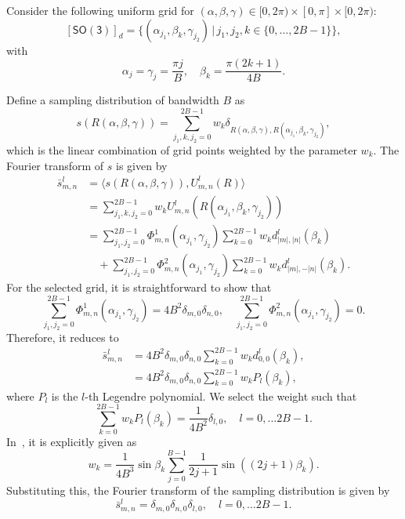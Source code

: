 \documentclass[onecolumn,11pt]{IEEEtran}
\newcommand{\pair}[1]{\ensuremath{\langle #1 \rangle}}
\newcommand{\SO}{\ensuremath{\mathsf{SO(3)}}}
\begin{document}
Consider the following uniform grid for $(\alpha,\beta,\gamma)\in[0,2\pi)\times[0,\pi]\times[0,2\pi)$:
\[
[\SO]_d=\{(\alpha_{j_1},\beta_k,\gamma_{j_2})\,|\, j_1,j_2,k\in\{0,\ldots, 2B-1\}\},
\]
with
\begin{equation}\label{eqn:grid_real}
\alpha_j=\gamma_j= \frac{\pi j}{B},\quad \beta_k = \frac{\pi (2k+1)}{4B}.
\end{equation}

Define a sampling distribution of bandwidth $B$ as
\begin{equation}
s(R(\alpha,\beta,\gamma))=\sum_{j_1,k,j_2=0}^{2B-1} w_k \delta_{R(\alpha,\beta,\gamma),R(\alpha_{j_1},\beta_k,\gamma_{j_2})},
\end{equation}
which is the linear combination of grid points weighted by the parameter $w_k$. 
The Fourier transform of $s$ is given by
\begin{align*}
\bar s^l_{m,n} & = \pair{s(R(\alpha,\beta,\gamma)), U^l_{m,n}(R)}\\
               & = \sum_{j_1,k,j_2=0}^{2B-1} w_k U^l_{m,n}(R(\alpha_{j_1},\beta_k,\gamma_{j_2}))\\
               & = \sum_{j_1,j_2=0}^{2B-1} \Phi^1_{m,n}(\alpha_{j_1},\gamma_{j_2}) \sum_{k=0}^{2B-1} w_k d^l_{|m|,|n|}(\beta_k)\\
               & \quad + \sum_{j_1,j_2=0}^{2B-1} \Phi^2_{m,n}(\alpha_{j_1},\gamma_{j_2}) \sum_{k=0}^{2B-1} w_k d^l_{|m|,-|n|}(\beta_k).
\end{align*}
For the selected grid, it is straightforward to show that
\[
    \sum_{j_1,j_2=0}^{2B-1} \Phi^1_{m,n}(\alpha_{j_1},\gamma_{j_2})=4B^2 \delta_{m,0}\delta_{n,0},\quad
    \sum_{j_1,j_2=0}^{2B-1} \Phi^2_{m,n}(\alpha_{j_1},\gamma_{j_2})=0.
\]
Therefore, it reduces to
\begin{align*}
\bar s^l_{m,n}  
& = 4B^2 \delta_{m,0}\delta_{n,0}\sum_{k=0}^{2B-1} w_k d^l_{0,0}(\beta_k),\\
& = 4B^2 \delta_{m,0}\delta_{n,0}\sum_{k=0}^{2B-1} w_k P_l(\beta_k),
\end{align*}
where $P_l$ is the $l$-th Legendre polynomial. 
We select the weight such that
\begin{equation}
\sum_{k=0}^{2B-1} w_k P_l(\beta_k) = \frac{1}{4B^2} \delta_{l,0},\quad l=0,\ldots 2B-1.
\end{equation}
In~\cite{DriHeaAAM94}, it is explicitly given as
\begin{equation}
w_k = \frac{1}{4B^3}\sin\beta_k \sum_{j=0}^{B-1} \frac{1}{2j+1}\sin((2j+1)\beta_k).
\end{equation}
Substituting this, the Fourier transform of the sampling distribution is given by
\begin{equation}
\bar s ^l_{m,n}=\delta_{m,0}\delta_{n,0}\delta_{l,0},\quad l=0,\ldots 2B-1.
\label{eqn:bar_s_real}
\end{equation}
\end{document}
